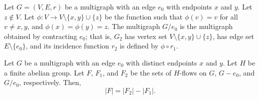 \begin{definition}[Contraction]
	Let \(G = (V, E, r)\) be a multigraph with an edge \(e_0\) with endpoints \(x\) and \(y\).
	Let \(z \notin V\).
	Let \(\phi \colon V \to V \setminus \{x, y\} \cup \{z\}\) be the function such that \(\phi(v) = v\) for all \(v \neq x, y\), and \(\phi(x) = \phi(y) = z\).
	The multigraph \(G / e_0\) is the multigraph obtained by contracting \(e_0\);
	that is,
	\(G_2\) has vertex set \(V \setminus \{x, y\} \cup \{z\}\),
	has edge set \(E \setminus \{e_0\}\),
	and its incidence function \(r_2\) is defined by \(\phi \circ r_1\).
\end{definition}

\begin{lemma} \label{lem:recursion_flow_polynomial}
	Let \(G\) be a multigraph with an edge \(e_0\) with distinct endpoints \(x\) and \(y\).
	Let \(H\) be a finite abelian group.
	Let \(F\), \(F_1\), and \(F_2\) be the sets of \(H\)-flows on \(G\), \(G - e_0\), and \(G / e_0\), respectively.
	Then,
	\begin{equation}
		|F| = |F_2| - |F_1|.
	\end{equation}
\end{lemma}

